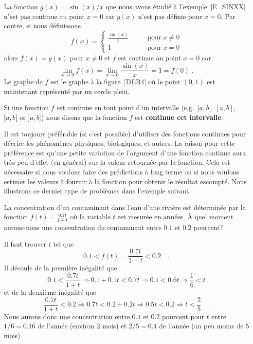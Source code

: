 {\begin{egg}
La fonction $g(x) = \sin(x)/x$ que nous avons étudié à
l'exemple~\ref{E_SINXX} n'est pas continue au point $x=0$ car $g(x)$
n'est pas définie pour $x=0$. Par contre, si nous définissons
\[
f(x) = \begin{cases}
\displaystyle \frac{\sin(x)}{x} & \qquad \text{pour} \; x\neq 0 \\
1 & \qquad \text{pour} \; x = 0
\end{cases}
\]
alors $f(x) = g(x)$ pour $x\neq 0$ et $f$ est continue au point $x=0$
car
\[
\lim_{x \rightarrow 0} f(x) = \lim_{x\rightarrow 0} \frac{\sin(x)}{x}
= 1 = f(0) \; .
\]
Le graphe de $f$ est le graphe à la figure~\ref{DER4} où le point
$(0,1)$ est maintenant représenté par un cercle plein.
\end{egg}

\begin{defn} 
Si une fonction $f$ est continue en tout point d'un intervalle
(e.g.\ $]a,b[$, $[a,b]$, $[a,b[$ or $]a,b]$) nous disons que la fonction
$f$ est {\bfseries continue cet intervalle}.
\end{defn}

Il est toujours préférable (si c'est possible) d'utiliser des
fonctions continues pour décrire les phénomènes physiques,
biologiques, et autres.  La raison pour cette préférence est qu'une
petite variation de l'argument d'une fonction continue aura très peu
d'effet (en général) sur la valeur retournée par la fonction.  Cela
est nécessaire si nous voulons faire des prédictions à long terme ou si
nous voulons estimer les valeurs à fournir à la fonction pour obtenir le
résultat escompté.  Nous illustrons ce dernier type de problèmes dans
l'exemple suivant.

\begin{egg}[\life]
La concentration d'un contaminant dans l'eau d'une rivière est
déterminée par la fonction
$\displaystyle f(t) = \frac{0.7 t}{1+t}$ où la variable $t$ est mesurée
en années.  À quel moment aurons-nous une concentration du contaminant
entre $0.1$ et $0.2$ pourcent?

Il faut trouver $t$ tel que
\[
  0.1 < f(t) = \frac{0.7t}{1+t} < 0.2 \quad .
\]
Il découle de la première inégalité que
\[
  0.1 < \frac{0.7t}{1+t} \Rightarrow 0.1 + 0.1 t < 0.7 t
  \Rightarrow 0.1 < 0.6 t \Rightarrow \frac{1}{6} < t
\]
et de la deuxième inégalité que
\[
  \frac{0.7t}{1+t} < 0.2 \Rightarrow 0.7 t < 0.2 + 0.2 t
  \Rightarrow 0.5 t < 0.2 \Rightarrow t < \frac{2}{5} \quad .
\]
Nous aurons donc une concentration entre $0.1$ et $0.2$ pourcent pour
$t$ entre $1/6 = 0.1\overline{6}$ de l'année (environ $2$ mois) et
$2/5 = 0.4$ de l'année (un peu moins de $5$ mois).


\end{egg}}
